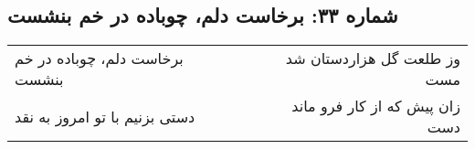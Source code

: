 \begin{center}
\section*{شماره ۳۳: برخاست دلم، چوباده در خم بنشست}
\label{sec:033}
\begin{longtable}{l p{0.5cm} r}
برخاست دلم، چوباده در خم بنشست
&&
وز طلعت گل هزاردستان شد مست
\\
دستی بزنیم با تو امروز به نقد
&&
زان پیش که از کار فرو ماند دست
\\
\end{longtable}
\end{center}
